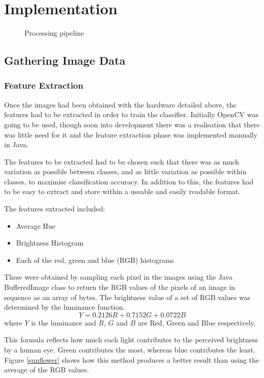 \documentclass[a4paper,12pt,twoside]{report}
\begin{document}
\chapter{Implementation}
\begin{figure}[!htb]
  \centering
  
  \caption{Processing pipeline}
\end{figure}

\section{Gathering Image Data}

\subsection{Feature Extraction}
Once the images had been obtained with the hardware detailed above, the features had to be extracted in order to train the classifier. Initially OpenCV\cite{opencv} was going to be used, though soon into development there was a realisation that there was little need for it and the feature extraction phase was implemented manually in Java.

The features to be extracted had to be chosen such that there was as much variation as possible between classes, and as little variation as possible within classes, to maximise classification accuracy. In addition to this, the features had to be easy to extract and store within a useable and easily readable format. 

The features extracted included:
\begin{itemize}
  \item Average Hue
  \item Brightness Histogram
  \item Each of the red, green and blue (RGB) histograms
\end{itemize}

These were obtained by sampling each pixel in the images using the Java BufferedImage\cite{bufferedimage} class to return the RGB values of the pixels of an image in sequence as an array of bytes.
The brightness value of a set of RGB values was determined by the luminance function.
$$Y = 0.2126R + 0.7152G + 0.0722B$$
where $Y$ is the luminance and $R$, $G$ and $B$ are Red, Green and Blue respectively.

This formula reflects how much each light contributes to the perceived brightness by a human eye\cite{Sutter1992433}. Green contributes the most, whereas blue contributes the least. Figure \ref{sunflower} shows how this method produces a better result than using the average of the RGB values\cite{sunflower}.
\end{document}
